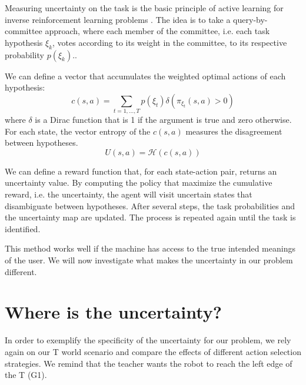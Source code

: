 
Measuring uncertainty on the task is the basic principle of active learning for inverse reinforcement learning problems \cite{lopes2009active, macl09airl}. The idea is to take a query-by-committee approach, where each member of the committee, i.e. each task hypothesis $\xi_k$, votes according to its weight in the committee, to its respective probability $p(\xi_k)$.. 

We can define a vector that accumulates the weighted optimal actions of each hypothesis: 
%
\[
c(s,a) = \sum_{t = 1, \ldots, T} p(\xi_t) \delta(\pi_{\xi_t}(s,a) > 0)
\]
%
where $\delta$ is a Dirac function that is 1 if the argument is true and zero otherwise. For each state, the vector entropy of the $c(s,a)$ measures the disagreement between hypotheses.
%
\[
U(s,a) = \mathcal{H}(c(s,a))
\]
%

We can define a reward function that, for each state-action pair, returns an uncertainty value. By computing the policy that maximize the cumulative reward, i.e. the uncertainty, the agent will visit uncertain states that disambiguate between hypotheses. After several steps, the task probabilities and the uncertainty map are updated. The process is repeated again until the task is identified.

This method works well if the machine has access to the true intended meanings of the user. We will now investigate what makes the uncertainty in our problem different.

\section{Where is the uncertainty?}
\label{chapter:planning:where}

In order to exemplify the specificity of the  uncertainty for our problem, we rely again on our T world scenario and compare the effects of different action selection strategies. We remind that the teacher wants the robot to reach the left edge of the T (G1).


